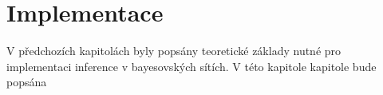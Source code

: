 \chapter{Implementace}
V předchozích kapitolách byly popsány teoretické základy nutné pro implementaci inference v bayesovských sítích.
V této kapitole kapitole bude popsána 
